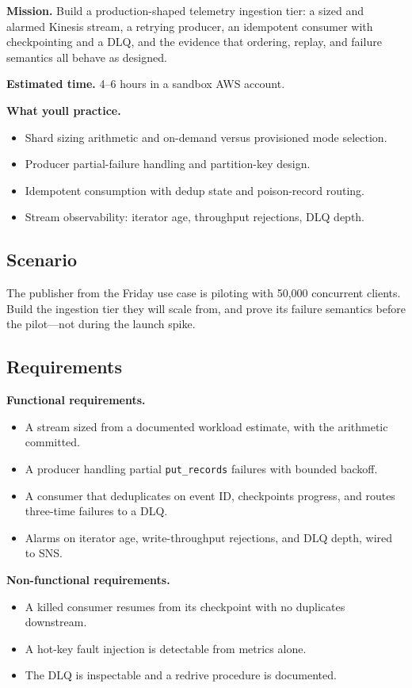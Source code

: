 \begin{capstonebox}
\textbf{Mission.} Build a production-shaped telemetry ingestion tier: a sized and alarmed Kinesis stream, a retrying producer, an idempotent consumer with checkpointing and a DLQ, and the evidence that ordering, replay, and failure semantics all behave as designed.

\textbf{Estimated time.} 4--6 hours in a sandbox AWS account.

\textbf{What you\textquotesingle{}ll practice.}
\begin{itemize}
    \item Shard sizing arithmetic and on-demand versus provisioned mode selection.
    \item Producer partial-failure handling and partition-key design.
    \item Idempotent consumption with dedup state and poison-record routing.
    \item Stream observability: iterator age, throughput rejections, DLQ depth.
\end{itemize}
\end{capstonebox}

\subsection*{Scenario}
The publisher from the Friday use case is piloting with 50{,}000 concurrent clients. Build the ingestion tier they will scale from, and prove its failure semantics before the pilot---not during the launch spike.

\subsection*{Requirements}
\textbf{Functional requirements.}
\begin{itemize}
    \item A stream sized from a documented workload estimate, with the arithmetic committed.
    \item A producer handling partial \texttt{put\_records} failures with bounded backoff.
    \item A consumer that deduplicates on event ID, checkpoints progress, and routes three-time failures to a DLQ.
    \item Alarms on iterator age, write-throughput rejections, and DLQ depth, wired to SNS.
\end{itemize}

\textbf{Non-functional requirements.}
\begin{itemize}
    \item A killed consumer resumes from its checkpoint with no duplicates downstream.
    \item A hot-key fault injection is detectable from metrics alone.
    \item The DLQ is inspectable and a redrive procedure is documented.
\end{itemize}

